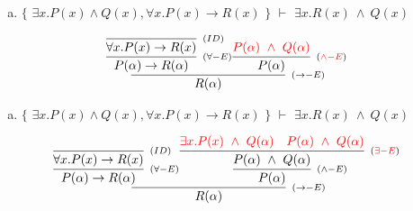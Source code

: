 \documentclass[aspectratio=43]{beamer}
\begin{document}
    \begin{frame}[fragile]
    
    	\begin{enumerate}[d)]
			\item $\{$ $\exists x.P(x)\land Q(x), \forall x.P(x)\to R(x)$ $\}$ $\vdash$ $\exists x.R(x)\ \land\ Q(x) $\\
		\end{enumerate}
        
        \vspace{70pt}
        
        \[
        \begin{array}{c}
		
        	\infer[_{(\to -E)}]
            	{R(\alpha)}
            	{\infer[_{(\forall -E)}]
                	{P(\alpha) \rightarrow R(\alpha)} 
                    {\infer[_{(ID)}]
                    	{\forall x.P(x)\to R(x)}
                    	{}
                    }  
            	\infer[_{(\textcolor{red}{\land -E})}] 
                	{P(\alpha)}
                    {\textcolor{red}{P(\alpha)\ \land \ Q(\alpha)}}
                }
		\end{array}
        \]
        
	\end{frame}
    
    \begin{frame}[fragile]
    
    	\begin{enumerate}[d)]
			\item $\{$ $\exists x.P(x)\land Q(x), \forall x.P(x)\to R(x)$ $\}$ $\vdash$ $\exists x.R(x)\ \land\ Q(x) $\\
		\end{enumerate}
        
        \vspace{65pt}
        
        \[
        \begin{array}{c}
		
        	\infer[_{(\to -E)}]
            	{R(\alpha)}
            	{\infer[_{(\forall -E)}]
                	{P(\alpha) \rightarrow R(\alpha)} 
                    {\infer[_{(ID)}]
                    	{\forall x.P(x)\to R(x)}
                    	{}
                    }  
            	\infer[_{(\land -E)}] 
                	{P(\alpha)}
                    {\infer[_{(\textcolor{red}{\exists -E})}]
                    	{P(\alpha)\ \land \ Q(\alpha)}
                    	{\textcolor{red}{\exists x.P(x)\ \land \ Q(\alpha)}
                        \hspace{10pt}
                        \textcolor{red}{P(\alpha)\ \land \ Q(\alpha)}
                        }
                    }
                }
		\end{array}
        \]
        
	\end{frame}
    
\end{document}
